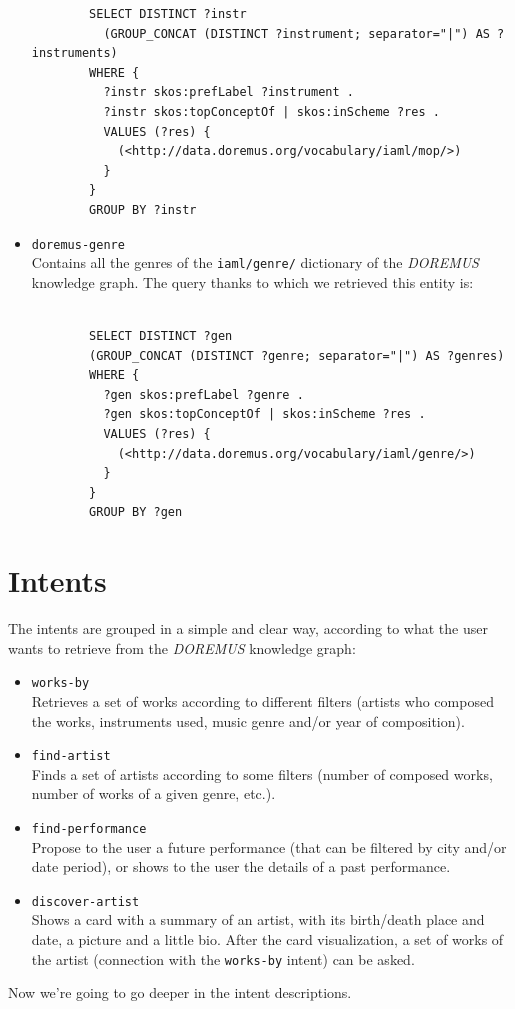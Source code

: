 \documentclass[a4paper,12pt]{report}
\begin{document}
\begin{itemize}
\begin{lstlisting}
		SELECT DISTINCT ?instr
		  (GROUP_CONCAT (DISTINCT ?instrument; separator="|") AS ?instruments)
		WHERE {
		  ?instr skos:prefLabel ?instrument .
		  ?instr skos:topConceptOf | skos:inScheme ?res .
		  VALUES (?res) {
		    (<http://data.doremus.org/vocabulary/iaml/mop/>)
		  }
		}
		GROUP BY ?instr
		\end{lstlisting}
		
		\item \texttt{doremus-genre}\\
		Contains all the genres of the \texttt{iaml/genre/} dictionary of the \textit{DOREMUS} knowledge graph. The query thanks to which we retrieved this entity is:
		\begin{lstlisting}
		
		SELECT DISTINCT ?gen
		(GROUP_CONCAT (DISTINCT ?genre; separator="|") AS ?genres)
		WHERE {
		  ?gen skos:prefLabel ?genre .
		  ?gen skos:topConceptOf | skos:inScheme ?res .
		  VALUES (?res) {
		    (<http://data.doremus.org/vocabulary/iaml/genre/>)
		  }
		}
		GROUP BY ?gen
		\end{lstlisting}
	\end{itemize}

	\section{Intents}
	The intents are grouped in a simple and clear way, according to what the user wants to retrieve from the \textit{DOREMUS} knowledge graph:
	\begin{itemize}
		\item \texttt{works-by}\\
		Retrieves a set of works according to different filters (artists who composed the works, instruments used, music genre and/or year of composition).
		\item \texttt{find-artist}\\
		Finds a set of artists according to some filters (number of composed works, number of works of a given genre, etc.).
		\item \texttt{find-performance}\\
		Propose to the user a future performance (that can be filtered by city and/or date period), or shows to the user the details of a past performance.
		\item \texttt{discover-artist}\\
		Shows a card with a summary of an artist, with its birth/death place and date, a picture and a little bio. After the card visualization, a set of works of the artist (connection with the \texttt{works-by} intent) can be asked.
	\end{itemize}
	Now we're going to go deeper in the intent descriptions.
\end{document}
